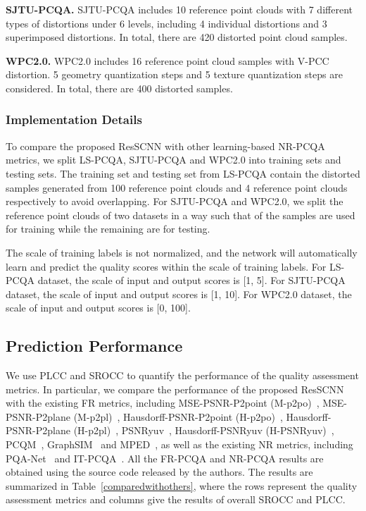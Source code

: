 \documentclass[acmsmall]{acmart}
\begin{document}
\textbf{SJTU-PCQA.} SJTU-PCQA includes 10 reference point clouds with 7 different types of distortions under 6 levels, including 4 individual distortions and 3 superimposed distortions. In total, there are 420 distorted point cloud samples.

\textbf{WPC2.0.} WPC2.0 includes 16 reference point cloud samples with V-PCC distortion. 5 geometry quantization steps and 5 texture quantization steps are considered. In total, there are 400 distorted samples.


\subsubsection{Implementation Details}

 \par To compare the proposed ResSCNN with other learning-based NR-PCQA metrics, we split LS-PCQA, SJTU-PCQA and WPC2.0 into training sets and testing sets. The training set and testing set from LS-PCQA contain the distorted samples generated from 100 reference point clouds and 4 reference point clouds respectively to avoid overlapping. For SJTU-PCQA and WPC2.0, we split the reference point clouds of two datasets in a way such that  of the samples are used for training while the remaining  are for testing.

\par The scale of training labels is not normalized, and the network will automatically learn and predict the quality scores within the scale of training labels. For LS-PCQA dataset, the scale of input and output scores is [1, 5]. For SJTU-PCQA dataset, the scale of input and output scores is [1, 10]. For WPC2.0 dataset, the scale of input and output scores is [0, 100].











\subsection{Prediction Performance}\label{sec:LSexperiment}

\par We use PLCC and SROCC to quantify the performance of the quality assessment metrics. In particular, we compare the performance of the proposed ResSCNN with the existing FR metrics, including MSE-PSNR-P2point (M-p2po)~\cite{cignoni1998metro,MPEGSoft}, MSE-PSNR-P2plane (M-p2pl)~\cite{Mekuria2016Evaluation,MPEGSoft}, Hausdorff-PSNR-P2point (H-p2po)~\cite{cignoni1998metro,MPEGSoft}, Hausdorff-PSNR-P2plane (H-p2pl)~\cite{Mekuria2016Evaluation,MPEGSoft}, PSNRyuv~\cite{MPEGSoft}, Hausdorff-PSNRyuv (H-PSNRyuv)~\cite{MPEGSoft}, PCQM~\cite{meynet2020pcmd}, GraphSIM~\cite{yang2020graphsim} and MPED~\cite{yang2021MPED}, as well as  the existing NR metrics, including PQA-Net~\cite{Liu2021PQANet} and IT-PCQA~\cite{Yang2021ITPCQA}. All the FR-PCQA and NR-PCQA results are obtained using the source code released by the authors. The results are summarized in Table~\ref{comparedwithothers}, where the rows represent the quality assessment metrics and columns give the results of overall SROCC and PLCC.
\end{document}
